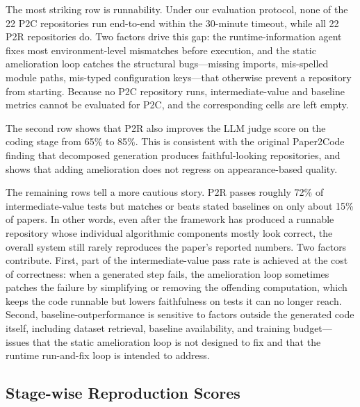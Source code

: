 \documentclass[11pt]{article}
\begin{document}
The most striking row is runnability. Under our evaluation
protocol, none of the 22 P2C repositories run end-to-end within
the 30-minute timeout, while all 22 P2R repositories do. Two
factors drive this gap: the runtime-information agent fixes most
environment-level mismatches before execution, and the static
amelioration loop catches the structural bugs---missing imports,
mis-spelled module paths, mis-typed configuration keys---that
otherwise prevent a repository from starting. Because no P2C
repository runs, intermediate-value and baseline metrics cannot
be evaluated for P2C, and the corresponding cells are left
empty.

The second row shows that P2R also improves the LLM judge score
on the coding stage from 65\% to 85\%. This is consistent with
the original Paper2Code finding that decomposed generation
produces faithful-looking repositories, and shows that adding
amelioration does not regress on appearance-based quality.

The remaining rows tell a more cautious story. P2R passes
roughly 72\% of intermediate-value tests but matches or beats
stated baselines on only about 15\% of papers. In other words,
even after the framework has produced a runnable repository
whose individual algorithmic components mostly look correct, the
overall system still rarely reproduces the paper's reported
numbers. Two factors contribute. First, part of the
intermediate-value pass rate is achieved at the cost of
correctness: when a generated step fails, the amelioration loop
sometimes patches the failure by simplifying or removing the
offending computation, which keeps the code runnable but lowers
faithfulness on tests it can no longer reach. Second,
baseline-outperformance is sensitive to factors outside the
generated code itself, including dataset retrieval, baseline
availability, and training budget---issues that the static
amelioration loop is not designed to fix and that the runtime
run-and-fix loop is intended to address.

\subsection{Stage-wise Reproduction Scores}
\end{document}
